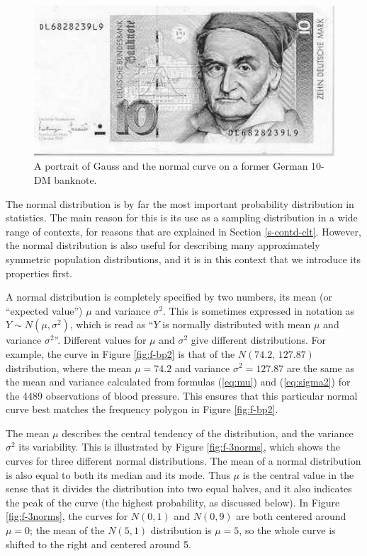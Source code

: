 \documentclass[11pt,a4paper,openany]{book}
\begin{document}
\begin{figure}[htbp]
\centering
\includegraphics[width=14.00000cm]{mark.pdf}
\caption{\label{fig:f-10dm} A portrait of Gauss and the normal curve on a
former German 10-DM banknote.}
\end{figure}

The normal distribution is by far the most important probability
distribution in statistics. The main reason for this is its use as a
sampling distribution in a wide range of contexts, for reasons that are
explained in Section \ref{s-contd-clt}. However, the normal distribution
is also useful for describing many approximately symmetric population
distributions, and it is in this context that we introduce its
properties first.

A normal distribution is completely specified by two numbers, its mean
(or ``expected value'') \(\mu\) and variance \(\sigma^{2}\). This is
sometimes expressed in notation as \(Y\sim N(\mu, \sigma^{2})\), which
is read as ``\(Y\) is normally distributed with mean \(\mu\) and
variance \(\sigma^{2}\)''. Different values for \(\mu\) and
\(\sigma^{2}\) give different distributions. For example, the curve in
Figure \ref{fig:f-bp2} is that of the \(N(74.2, \, 127.87)\)
distribution, where the mean \(\mu=74.2\) and variance
\(\sigma^{2}=127.87\) are the same as the mean and variance calculated
from formulas (\ref{eq:mu}) and (\ref{eq:sigma2}) for the 4489
observations of blood pressure. This ensures that this particular normal
curve best matches the frequency polygon in Figure \ref{fig:f-bp2}.

The mean \(\mu\) describes the central tendency of the distribution, and
the variance \(\sigma^{2}\) its variability. This is illustrated by
Figure \ref{fig:f-3norms}, which shows the curves for three different
normal distributions. The mean of a normal distribution is also equal to
both its median and its mode. Thus \(\mu\) is the central value in the
sense that it divides the distribution into two equal halves, and it
also indicates the peak of the curve (the highest probability, as
discussed below). In Figure \ref{fig:f-3norms}, the curves for
\(N(0, 1)\) and \(N(0, 9)\) are both centered around \(\mu=0\); the mean
of the \(N(5, 1)\) distribution is \(\mu=5\), so the whole curve is
shifted to the right and centered around 5.
\end{document}
